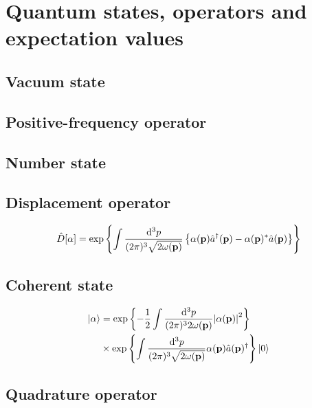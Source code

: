 \section{Quantum states, operators and expectation values}

\subsection{Vacuum state}

\subsection{Positive-frequency operator}

\subsection{Number state}

\subsection{Displacement operator}

\begin{equation}
	\hat{D}[\alpha]
	=
	\exp\left\{
		\int\frac{\dd[3]{p}}{(2\pi)^3\sqrt{2\omega(\vb{p})}}
		\left\{
			\alpha(\vb{p})
			\hat{a}^\dagger(\vb{p})
			-
			\alpha(\vb{p})^*
			\hat{a}(\vb{p})
		\right\}
	\right\}
\end{equation}

\subsection{Coherent state}

\begin{equation}
	\begin{split}
		\ket{\alpha}
		&=
		\exp\left\{
			-
			\frac{1}{2}
			\int\frac{\dd[3]{p}}{(2\pi)^32\omega(\vb{p})}
			\abs{\alpha(\vb{p})}^2
		\right\}
		\\
		&\times
		\exp\left\{
			\int\frac{\dd[3]{p}}{(2\pi)^3\sqrt{2\omega(\vb{p})}}
			\alpha(\vb{p})
			\hat{a}(\vb{p})^\dagger
		\right\}
		\ket{0}
	\end{split}
\end{equation}

\subsection{Quadrature operator}


